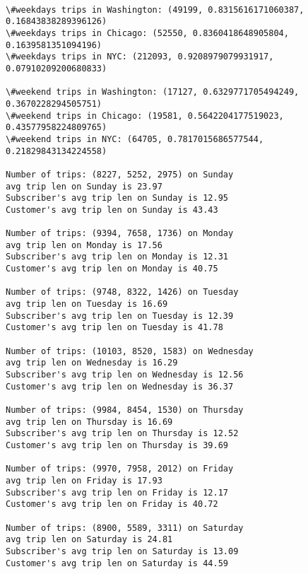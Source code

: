 \documentclass[11pt]{article}
\begin{document}
    \begin{Verbatim}[commandchars=\\\{\}]

\#weekdays trips in Washington: (49199, 0.8315616171060387, 0.16843838289396126)
\#weekdays trips in Chicago: (52550, 0.8360418648905804, 0.1639581351094196)
\#weekdays trips in NYC: (212093, 0.9208979079931917, 0.07910209200680833)

\#weekend trips in Washington: (17127, 0.6329771705494249, 0.3670228294505751)
\#weekend trips in Chicago: (19581, 0.5642204177519023, 0.43577958224809765)
\#weekend trips in NYC: (64705, 0.7817015686577544, 0.21829843134224558)

Number of trips: (8227, 5252, 2975) on Sunday
avg trip len on Sunday is 23.97
Subscriber's avg trip len on Sunday is 12.95
Customer's avg trip len on Sunday is 43.43

Number of trips: (9394, 7658, 1736) on Monday
avg trip len on Monday is 17.56
Subscriber's avg trip len on Monday is 12.31
Customer's avg trip len on Monday is 40.75

Number of trips: (9748, 8322, 1426) on Tuesday
avg trip len on Tuesday is 16.69
Subscriber's avg trip len on Tuesday is 12.39
Customer's avg trip len on Tuesday is 41.78

Number of trips: (10103, 8520, 1583) on Wednesday
avg trip len on Wednesday is 16.29
Subscriber's avg trip len on Wednesday is 12.56
Customer's avg trip len on Wednesday is 36.37

Number of trips: (9984, 8454, 1530) on Thursday
avg trip len on Thursday is 16.69
Subscriber's avg trip len on Thursday is 12.52
Customer's avg trip len on Thursday is 39.69

Number of trips: (9970, 7958, 2012) on Friday
avg trip len on Friday is 17.93
Subscriber's avg trip len on Friday is 12.17
Customer's avg trip len on Friday is 40.72

Number of trips: (8900, 5589, 3311) on Saturday
avg trip len on Saturday is 24.81
Subscriber's avg trip len on Saturday is 13.09
Customer's avg trip len on Saturday is 44.59


    \end{Verbatim}
\end{document}

